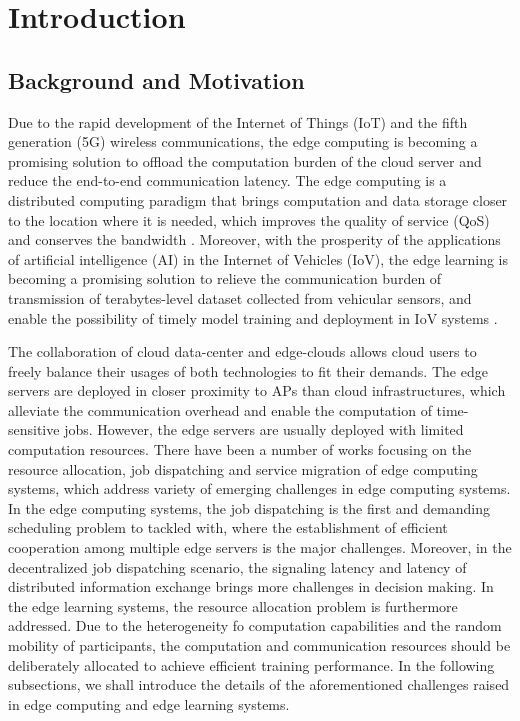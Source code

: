 
\chapter{Introduction}
\label{ch1}

\section{Background and Motivation}

Due to the rapid development of the Internet of Things (IoT) and the fifth generation (5G) wireless communications, the edge computing is becoming a promising solution to offload the computation burden of the cloud server and reduce the end-to-end communication latency.
The edge computing is a distributed computing paradigm that brings computation and data storage closer to the location where it is needed, which improves the quality of service (QoS) and conserves the bandwidth \cite{MEC-SURVEY}.
Moreover, with the prosperity of the applications of artificial intelligence (AI) in the Internet of Vehicles (IoV), the edge learning is becoming a promising solution to relieve the communication burden of transmission of terabytes-level dataset collected from vehicular sensors, and enable the possibility of timely model training and deployment in IoV systems \cite{vfl-survey}.

The collaboration of cloud data-center and edge-clouds allows cloud users to freely balance their usages of both technologies to fit their demands.
The edge servers are deployed in closer proximity to APs than cloud infrastructures, which alleviate the communication overhead and enable the computation of time-sensitive jobs.
However, the edge servers are usually deployed with limited computation resources.
There have been a number of works focusing on the resource allocation, job dispatching and service migration of edge computing systems, which address variety of emerging challenges in edge computing systems.
In the edge computing systems, the job dispatching is the first and demanding scheduling problem to tackled with, where the establishment of efficient cooperation among multiple edge servers is the major challenges.
Moreover, in the decentralized job dispatching scenario, the signaling latency and latency of distributed information exchange brings more challenges in decision making.
In the edge learning systems, the resource allocation problem is furthermore addressed.
Due to the heterogeneity fo computation capabilities and the random mobility of participants, the computation and communication resources should be deliberately allocated to achieve efficient training performance.
In the following subsections, we shall introduce the details of the aforementioned challenges raised in edge computing and edge learning systems.

